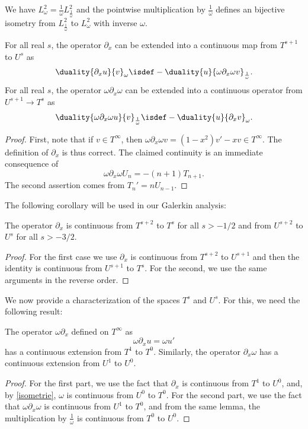 \documentclass[a4paper]{article}
\begin{document}
	\begin{Lem}
		We have $L^2_\omega = \frac{1}{\omega}L^2_\frac{1}{\omega}$ and the pointwise multiplication by $\frac{1}{\omega}$ defines an bijective isometry from $L^2_\frac{1}{\omega}$ to $L^2_\omega$ with inverse $\omega$. 
		\label{isometrie}
	\end{Lem}
	\begin{Lem}
		For all real $s$, the operator $\partial_x$ can be extended into a continuous map from $T^{s+1}$ to $U^{s}$ as
		\[ \duality{\partial_x u}{v}_{\omega} \isdef -\duality{u}{\omega \partial_x \omega v}_{\frac{1}{\omega}}.\] 
		For all real $s$, the  operator $\omega \partial_x \omega$ can be extended into a continuous operator from $U^{s+1} \to T^{s}$ as
		\[\duality{\omega \partial_x \omega u}{v}_\frac{1}{\omega} \isdef -\duality{u}{\partial_x v}_\omega.\]
		\begin{proof}
			First, note that if $v \in T^{\infty}$, then  $\omega \partial_x \omega v = (1-x^2)v' - xv \in T^{\infty}$. The definition of $\partial_x$ is thus correct. The claimed continuity  is an immediate consequence of 
			\[\omega \partial_x \omega U_n = -(n+1) T_{n+1}.\]
			The second assertion comes from $T_n' = nU_{n-1}$. 
		\end{proof}
	\end{Lem}
	\noindent The following corollary will be used in our Galerkin analysis:
	\begin{Cor}
		\label{corDxT2T0}
		The operator $\partial_x$ is continuous from $T^{s+2}$ to $T^s$ for all $s > -1/2 $ and from $U^{s+2}$ to $U^s$ for all $s > - 3/2$.
	\end{Cor}
	\begin{proof}
		For the first case we use $\partial_x$ is continuous from $T^{s+2}$ to $U^{s+1}$ and then the identity is continuous from $U^{s+1}$ to $T^s$. For the second, we use the same arguments in the reverse order. 
	\end{proof}
	We now provide a characterization of the spaces $T^s$ and $U^s$. For this, we need the following result:
	\begin{Cor}
		\label{omegadxetdxomga}
		The operator $\omega \partial_x$ defined on $T^{\infty}$ as 
		\[\omega \partial_x u = \omega u'\]
		has a continuous extension from $T^1$ to $T^0$. Similarly, the operator $\partial_x \omega$ has a continuous extension from $U^1$ to $U^0$. 
		\begin{proof}
			For the first part, we use the fact that $\partial_x$ is continuous from $T^1$ to $U^0$, and, by \autoref{isometrie}, $\omega$ is continuous from $U^0$ to $T^0$. 
			For the second part, we use the fact that $\omega \partial_x \omega$ is continuous from $U^1$ to $T^0$, and from the same lemma, the multiplication by $\frac{1}{\omega}$ is continuous from $T^0$ to $U^0$. 
		\end{proof}
	\end{Cor}
\end{document}

